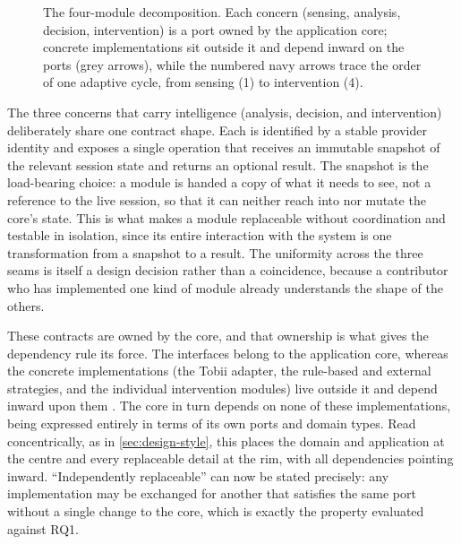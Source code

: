 \begin{figure}[htbp]
{%
}
\caption[The four-module decomposition.]{The four-module decomposition. Each concern (sensing, analysis, decision, intervention) is a port owned by the application core; concrete implementations sit outside it and depend inward on the ports (grey arrows), while the numbered navy arrows trace the order of one adaptive cycle, from sensing (1) to intervention (4).}
\label{fig:design-modules}
\end{figure}

The three concerns that carry intelligence (analysis, decision, and intervention) deliberately share one contract shape.
Each is identified by a stable provider identity and exposes a single operation that receives an immutable snapshot of the relevant session state and returns an optional result.
The snapshot is the load-bearing choice: a module is handed a copy of what it needs to see, not a reference to the live session, so that it can neither reach into nor mutate the core's state.
This is what makes a module replaceable without coordination and testable in isolation, since its entire interaction with the system is one transformation from a snapshot to a result.
The uniformity across the three seams is itself a design decision rather than a coincidence, because a contributor who has implemented one kind of module already understands the shape of the others.

These contracts are owned by the core, and that ownership is what gives the dependency rule its force.
The interfaces belong to the application core, whereas the concrete implementations (the Tobii adapter, the rule-based and external strategies, and the individual intervention modules) live outside it and depend inward upon them \cite{martin1996dip}.
The core in turn depends on none of these implementations, being expressed entirely in terms of its own ports and domain types.
Read concentrically, as in \cref{sec:design-style}, this places the domain and application at the centre and every replaceable detail at the rim, with all dependencies pointing inward.
``Independently replaceable'' can now be stated precisely: any implementation may be exchanged for another that satisfies the same port without a single change to the core, which is exactly the property evaluated against RQ1.

